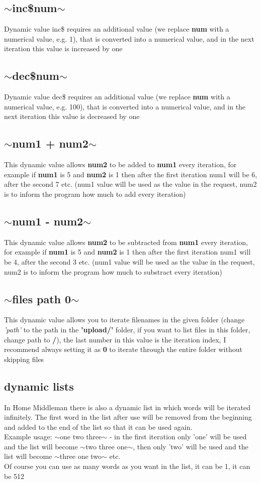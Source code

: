 \documentclass{article}
\begin{document}
\subsection{$\sim$inc\$num$\sim$}
Dynamic value inc\$ requires an additional value (we replace \textbf{num} with a numerical value, e.g. 1), that is converted into a numerical value, and in the next iteration this value is increased by one
\subsection{$\sim$dec\$num$\sim$}
Dynamic value dec\$ requires an additional value (we replace \textbf{num} with a numerical value, e.g. 100), that is converted into a numerical value, and in the next iteration this value is decreased by one
\subsection{$\sim$num1 + num2$\sim$}
This dynamic value allows \textbf{num2} to be added to \textbf{num1} every iteration, for example if \textbf{num1} is 5 and \textbf{num2} is 1 then after the first iteration num1 will be 6, after the second 7 etc. (num1 value will be used as the value in the request, num2 is to inform the program how much to add every iteration)
\subsection{$\sim$num1 - num2$\sim$}
This dynamic value allows \textbf{num2} to be subtracted from \textbf{num1} every iteration, for example if \textbf{num1} is 5 and \textbf{num2} is 1 then after the first iteration num1 will be 4, after the second 3 etc. (num1 value will be used as the value in the request, num2 is to inform the program how much to substract every iteration)
\subsection{$\sim$files path 0$\sim$}
This dynamic value allows you to iterate filenames in the given folder (change \textit{'path'} to the path in the \textbf{'upload/'} folder, if you want to list files in this folder, change path to \textbf{/}), the last number in this value is the iteration index, I recommend always setting it as \textbf{0} to iterate through the entire folder without skipping files
\subsection{dynamic lists}
In Home Middleman there is also a dynamic list in which words will be iterated infinitely. The first word in the list after use will be removed from the beginning and added to the end of the list so that it can be used again.\\
Example usage: $\sim${one two three}$\sim$ - in the first iteration only 'one' will be used and the list will become $\sim${two three one}$\sim$, then only 'two' will be used and the list will become $\sim${three one two}$\sim$ etc.\\
Of course you can use as many words as you want in the list, it can be 1, it can be 512
\end{document}
